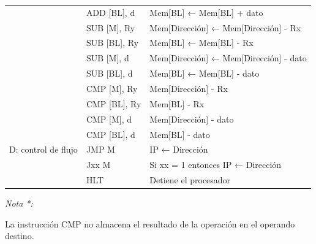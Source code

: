 \documentclass[12pt,oneside]{templates/unerthesis}
\begin{document}
\begin{table}[!h]
{\begin{threeparttable}
\begin{tabular}[t]{>{\raggedright\arraybackslash}p{4cm}>{\raggedright\arraybackslash}p{3cm}>{\raggedright\arraybackslash}p{8cm}}
 & ADD [BL], d & Mem[BL] ← Mem[BL] + dato\\
 & SUB [M], Ry & Mem[Dirección] ← Mem[Dirección] - Rx\\
\addlinespace
 & SUB [BL], Ry & Mem[BL] ← Mem[BL] - Rx\\
 & SUB [M], d & Mem[Dirección] ← Mem[Dirección] - dato\\
 & SUB [BL], d & Mem[BL] ← Mem[BL] - dato\\
 & CMP [M], Ry & Mem[Dirección] - Rx\\
 & CMP [BL], Ry & Mem[BL] - Rx\\
\addlinespace
 & CMP [M], d & Mem[Dirección] - dato\\
 & CMP [BL], d & Mem[BL] - dato\\
D: control de flujo & JMP M & IP ← Dirección\\
 & Jxx M & Si xx = 1 entonces IP ← Dirección\\
 & HLT & Detiene el procesador\\
\bottomrule
\end{tabular}
\begin{tablenotes}
\item \textit{Nota *: } 
\item La instrucción CMP no almacena el resultado de la operación en el operando destino.
\end{tablenotes}
\end{threeparttable}}
\end{table}
\end{document}
